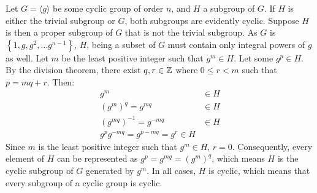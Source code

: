 \documentclass{article}
\begin{document}
Let $G = \langle g \rangle$ be some cyclic group of order $n$, and $H$ a subgroup of $G$. If $H$ is either the trivial subgroup or $G$, both subgroups are evidently cyclic. Suppose $H$ is then a proper subgroup of $G$ that is not the trivial subgroup. As $G$ is $\left\{1, g, g^2, \ldots g^{n-1}\right\}$, $H$, being a subset of $G$ must contain only integral powers of $g$ as well. Let $m$ be the least positive integer such that $g^m \in H$. Let some $g^p \in H$. By the division theorem, there exist $q, r \in \mathbb{Z}$ where $0 \leq r < m$ such that $p = mq + r$. Then:
\begin{equation}
    \begin{split}
        g^m & \in H \\
        \left(g^{m}\right)^q = g^{mq} & \in H \\
        \left(g^{mq}\right)^{-1} = g^{-mq} & \in H \\
        g^{p}g^{-mq} = g^{p-mq} = g^r \in H
    \end{split}
\end{equation}
Since $m$ is the least positive integer such that $g^m \in H$, $r = 0$. Consequently, every element of $H$ can be represented as $g^p = g^{mq} = \left(g^m\right)^q$, which means $H$ is the cyclic subgroup of $G$ generated by $g^m$. In all cases, $H$ is cyclic, which means that every subgroup of a cyclic group is cyclic.

\newpage

\end{document}
